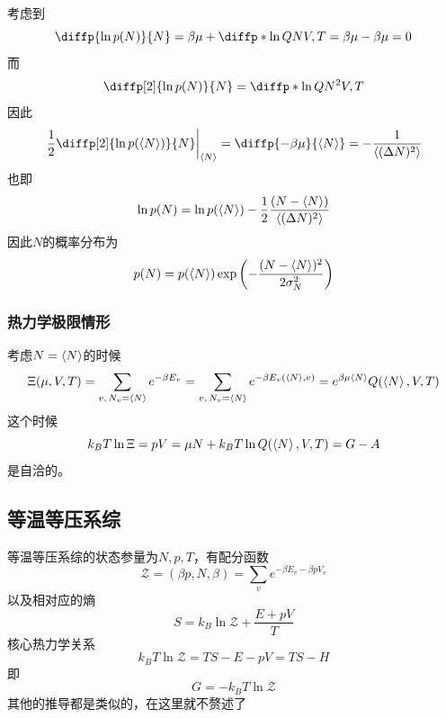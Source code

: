 考虑到\begin{equation}
       \diffp{\ln p(N)}{N}=\beta \mu +\diffp*{\ln Q}{N}{V,T}=\beta\mu-\beta\mu=0
\end{equation}
而\begin{equation}
       \diffp[2]{\ln p(N)}{N}=\diffp*{\ln Q}{{N^2}}{V,T}
\end{equation}
因此\begin{equation}
       \left.\frac{1}{2}\diffp[2]{\ln p(\braket{N})}{N}\right|_{\braket{N}}=\diffp{{-\beta \mu }}{{\langle N\rangle} }=-\frac{1}{\braket{(\Delta N)^2}}
\end{equation}
也即\begin{equation}
       \ln p(N)= \ln p(\braket{N})-\frac{1}{2}\frac{(N-\braket{N})}{\braket{(\Delta N)^2}}
\end{equation}
因此$N$的概率分布为\begin{equation}
      p(N)=p(\braket{N})\exp\left(-\frac{(N-\braket{N})^2}{2\sigma_N^2}\right)
\end{equation}
\subsubsection{热力学极限情形} %
\label{ssub:热力学极限情形}
考虑$N=\braket{N}$的时候\begin{equation}
       \Xi (\mu,V,T)=\sum_{v,\,N_v=\braket{N}} e^{-\beta E_v}=\sum_{v,\,N_v=\braket{N}} e^{-\beta E_v(\braket{N},v)}=e^{\beta\mu \braket{N}}Q(\braket{N},V,T)
\end{equation}
这个时候\begin{equation}
       k_BT \ln \Xi =pV =\mu N +k_BT \ln Q(\braket{N},V,T)=G-A
\end{equation}
是自洽的。
\subsection{等温等压系综} %
\label{sub:等温等压系综}
等温等压系综的状态参量为$N,p,T$，有配分函数\begin{equation}
       \mathcal{Z}=(\beta p,N,\beta) =\sum_{v} e^{-\beta E_v-\beta pV_v}
\end{equation}
以及相对应的熵\begin{equation}
       S=k_B\ln \mathcal{Z} +\frac{E+pV}{T}
\end{equation}
核心热力学关系\begin{equation}
       k_BT\ln \mathcal{Z}=TS-E-pV=TS-H
\end{equation}
即\begin{equation}
       G=-k_B T\ln \mathcal{Z}
\end{equation}
其他的推导都是类似的，在这里就不赘述了


